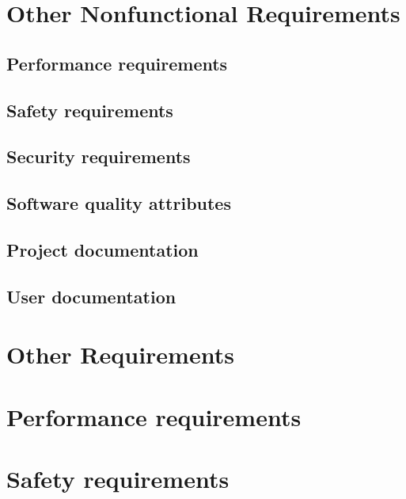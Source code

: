 \documentclass[10pt]{article}
\begin{document}





\section{Other Nonfunctional Requirements}

\subsection{Performance requirements}

\lipsum[10]

\subsection{Safety requirements}

\lipsum[10]

\subsection{Security requirements}

\lipsum[10]

\subsection{Software quality attributes}

\lipsum[10]

\subsection{Project documentation}

\lipsum[10]

\subsection{User documentation}

\lipsum[10]

\section{Other Requirements}

\begin{appendices}

	\section{Performance requirements}

	\lipsum[10]

	\section{Safety requirements}

	\lipsum[10]

\end{appendices}
\end{document}
